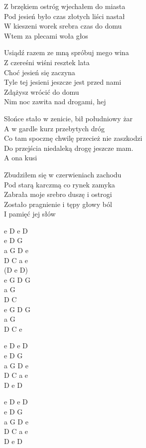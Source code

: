 \begin{text}
    Z brzękiem ostróg wjechałem do miasta\\
    Pod jesień było czas złotych liści nastał\\
    W kieszeni worek srebra czas do domu\\
    Wtem za plecami woła głos

    \vin Usiądź razem ze mną spróbuj mego wina\\
    \vin Z czereśni wiśni resztek lata\\
    \vin Choć jesień się zaczyna\\
    \vin Tyle tej jesieni jeszcze jest przed nami\\
    \vin Zdążysz wrócić do domu\\
    \vin Nim noc zawita nad drogami, hej

    Słońce stało w zenicie, bił południowy żar\\
    A w gardle kurz przebytych dróg\\
    Co tam spocznę chwilę przecież nie zaszkodzi\\
    Do przejścia niedaleką drogę jeszcze mam.\\
    A ona kusi

    Zbudziłem się w czerwieniach zachodu\\
    Pod starą karczmą co rynek zamyka\\
    Zabrała moje srebro duszę i ostrogi\\
    Zostało pragnienie i tępy głowy ból\\
    I pamięć jej słów
\end{text}
\begin{chord}
    e D e D\\
    e D G\\
    a G D e\\
    D C a e\\
    (D e D)\\
    e G D G\\
    a G\\
    D C\\
    e G D G\\
    a G\\
    D C e

    e D e D\\
    e D G\\
    a G D e\\
    D C a e\\
	D e D

    e D e D\\
    e D G\\
    a G D e\\
    D C a e\\
	D e D
\end{chord}